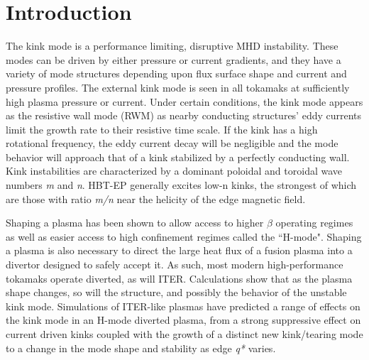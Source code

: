\documentclass[aps,prl,twocolumn,superscriptaddress,groupedaddress]{revtex4}  %
\begin{document}
\section{Introduction}
The kink mode is a performance limiting, disruptive MHD instability\cite{Strait}.  These modes can be driven by either pressure or current gradients, and they have a variety of mode structures depending upon flux surface shape and current and pressure profiles.  The external kink mode is seen in all tokamaks at sufficiently high plasma pressure or current.  Under certain conditions, the kink mode appears as the resistive wall mode (RWM) as nearby conducting structures' eddy currents limit the growth rate to their resistive time scale.  If the kink has a high rotational frequency, the eddy current decay will be negligible and the mode behavior will approach that of a kink stabilized by a perfectly conducting wall.  Kink instabilities are characterized by a dominant poloidal and toroidal wave numbers \textit{m} and \textit{n}.  HBT-EP generally excites low-n kinks, the strongest of which are those with ratio \textit{m/n} near the helicity of the edge magnetic field.\par
	Shaping a plasma has been shown to allow access to higher $\beta$ operating regimes as well as easier access to high confinement regimes called the ``H-mode"\citep{Lazarus, Keilhacker_HMode}. Shaping a plasma is also necessary to direct the large heat flux of a fusion plasma into a divertor designed to safely accept it.  As such, most modern high-performance tokamaks operate diverted, as will ITER.  Calculations show that as the plasma shape changes, so will the structure, and possibly the behavior of the unstable kink mode.  Simulations of ITER-like plasmas have predicted a range of effects on the kink mode in an H-mode diverted plasma, from a strong suppressive effect on current driven kinks coupled with the growth of a distinct new kink/tearing mode\cite{Huysmans} to a change in the mode shape and stability as edge \textit{q*} varies\cite{Maurer}.\par
\end{document}
